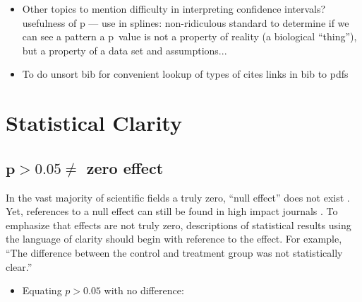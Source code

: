 \begin{itemize}
  \item Other topics to mention
  	\subitem difficulty in interpreting confidence intervals?
    \subitem usefulness of p --- use in splines: non-ridiculous standard to determine if we can see a pattern
    \subitem a p~value is not a property of reality (a biological ``thing''), but a property of a data set and assumptions...
\end{itemize}

\begin{itemize}
  \item To do
  	\subitem unsort bib for convenient lookup of types of cites
    \subitem links in bib to pdfs
\end{itemize}

\section*{Statistical Clarity}


\subsection*{$\mathbf{p > 0.05 \neq}$ zero effect}

In the vast majority of scientific fields a truly zero, ``null effect'' does not exist \citep{Meehl1990, Tukey1991,
Cohen1994}. Yet, references to a null effect can still be found in high impact journals \citep[e.g.][]{Feldonetal.2017}. 
To emphasize that effects are not truly zero, descriptions of statistical results using the language of clarity should
begin with reference to the effect. For example, ``The difference between the control and treatment group was not 
statistically clear.'' 

\begin{itemize}
  \item Equating $p > 0.05$ with no difference: \citep{Ortegoetal.2007, Singhetal.2017}
\end{itemize}



